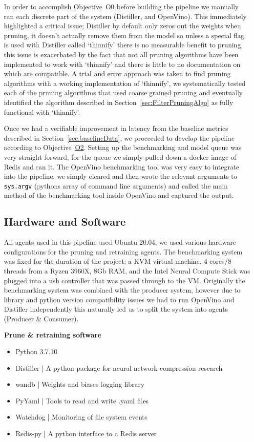 \documentclass[../Dissertation.tex]{subfiles}
\begin{document}
In order to accomplish Objective~\hyperref[obj:VerifyComp]{O0} before building the pipeline we manually ran each discrete part of the system (Distiller, and OpenVino). 
This immediately highlighted a critical issue; Distiller by default only zeros out the weights when pruning, it doesn't actually remove them from the model so unless a special flag is used with Distiller called `thinnify' there is no measurable benefit to pruning, this issue is exacerbated by the fact that not all pruning algorithms have been implemented to work with `thinnify' and there is little to no documentation on which are compatible. 
A trial and error approach was taken to find pruning algorithms with a working implementation of `thinnify', we systematically tested each of the pruning algorithms that used coarse grained pruning and eventually identified the algorithm described in Section~\ref{sec:FilterPruningAlgo} as fully functional with `thinnify'.

Once we had a verifiable improvement in latency from the baseline metrics described in Section~\ref{sec:baselineData}, we proceeded to develop the pipeline according to Objective~\hyperref[obj:BuildPipeline]{O2}.
Setting up the benchmarking and model queue was very straight forward, for the queue we simply pulled down a docker image of Redis and ran it.
The OpenVino benchmarking tool was very easy to integrate into the pipeline, we simply cleared and then wrote the relevant arguments to \texttt{sys.argv} (pythons array of command line arguments) and called the main method of the benchmarking tool inside OpenVino and captured the output.




\subsection{Hardware and Software}
All agents used in this pipeline used Ubuntu 20.04, we used various hardware configurations for the pruning and retraining agents. 
The benchmarking system was fixed for the duration of the project; a KVM virtual machine, 4 cores/8 threads from a Ryzen 3960X, 8Gb RAM, and the Intel Neural Compute Stick was plugged into a usb controller that was passed through to the VM.
Originally the benchmarking system was combined with the producer system, however due to library and python version compatibility issues we had to run OpenVino and Distiller independently this naturally led us to split the system into agents (Producer \& Consumer).

\textbf{Prune \& retraining software}
\begin{itemize}
    \item Python 3.7.10
    \item Distiller | A python package for neural network compression research
    \item wandb | Weights and biases logging library
    \item PyYaml | Tools to read and write .yaml files
    \item Watchdog | Monitoring of file system events
    \item Redis-py | A python interface to a Redis server
\end{itemize}
\end{document}

